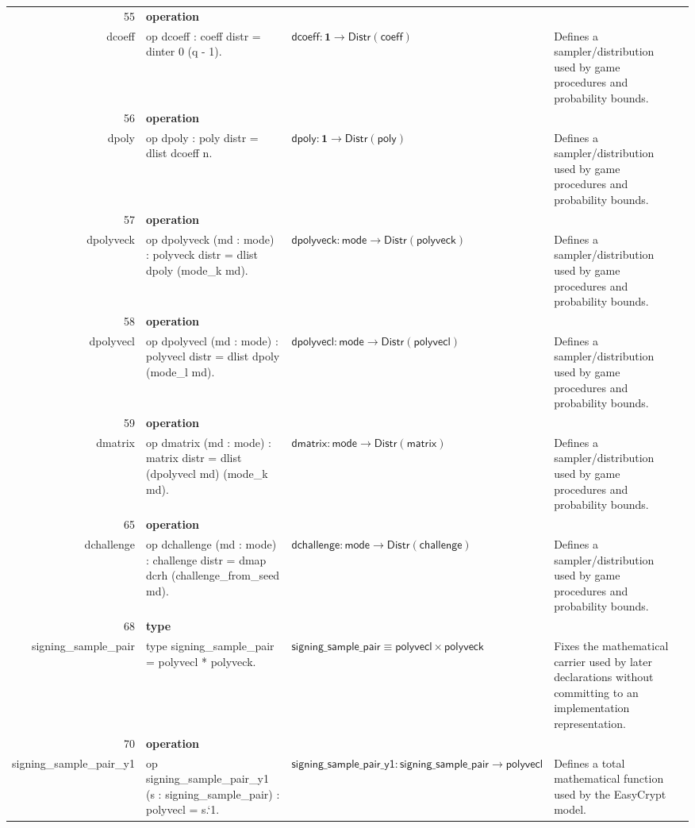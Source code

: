 \documentclass[10pt]{article}
\newcommand{\ec}[1]{\begingroup\ttfamily\scriptsize #1\endgroup}
\begin{document}
\begin{longtable}{r L{0.17\textwidth} L{0.26\textwidth} L{0.27\textwidth} L{0.20\textwidth}}
55 & \textbf{operation}\\\ec{dcoeff} & \ec{op dcoeff : coeff distr = dinter 0 (q - 1).} & \(\mathsf{dcoeff} : \mathbf{1} \to \mathsf{Distr}(\mathsf{coeff})\) & Defines a sampler/distribution used by game procedures and probability bounds. \\
56 & \textbf{operation}\\\ec{dpoly} & \ec{op dpoly : poly distr = dlist dcoeff n.} & \(\mathsf{dpoly} : \mathbf{1} \to \mathsf{Distr}(\mathsf{poly})\) & Defines a sampler/distribution used by game procedures and probability bounds. \\
57 & \textbf{operation}\\\ec{dpolyveck} & \ec{op dpolyveck (md : mode) : polyveck distr = dlist dpoly (mode\_k md).} & \(\mathsf{dpolyveck} : \mathsf{mode} \to \mathsf{Distr}(\mathsf{polyveck})\) & Defines a sampler/distribution used by game procedures and probability bounds. \\
58 & \textbf{operation}\\\ec{dpolyvecl} & \ec{op dpolyvecl (md : mode) : polyvecl distr = dlist dpoly (mode\_l md).} & \(\mathsf{dpolyvecl} : \mathsf{mode} \to \mathsf{Distr}(\mathsf{polyvecl})\) & Defines a sampler/distribution used by game procedures and probability bounds. \\
59 & \textbf{operation}\\\ec{dmatrix} & \ec{op dmatrix (md : mode) : matrix distr = dlist (dpolyvecl md) (mode\_k md).} & \(\mathsf{dmatrix} : \mathsf{mode} \to \mathsf{Distr}(\mathsf{matrix})\) & Defines a sampler/distribution used by game procedures and probability bounds. \\
65 & \textbf{operation}\\\ec{dchallenge} & \ec{op dchallenge (md : mode) : challenge distr = dmap dcrh (challenge\_from\_seed md).} & \(\mathsf{dchallenge} : \mathsf{mode} \to \mathsf{Distr}(\mathsf{challenge})\) & Defines a sampler/distribution used by game procedures and probability bounds. \\
68 & \textbf{type}\\\ec{signing\_sample\_pair} & \ec{type signing\_sample\_pair = polyvecl * polyveck.} & \(\mathsf{signing\_sample\_pair} \equiv \mathsf{polyvecl} \times \mathsf{polyveck}\) & Fixes the mathematical carrier used by later declarations without committing to an implementation representation. \\
70 & \textbf{operation}\\\ec{signing\_sample\_pair\_y1} & \ec{op signing\_sample\_pair\_y1 (s : signing\_sample\_pair) : polyvecl = s.`1.} & \(\mathsf{signing\_sample\_pair\_y1} : \mathsf{signing\_sample\_pair} \to \mathsf{polyvecl}\) & Defines a total mathematical function used by the EasyCrypt model. \\

\end{longtable}
\end{document}
